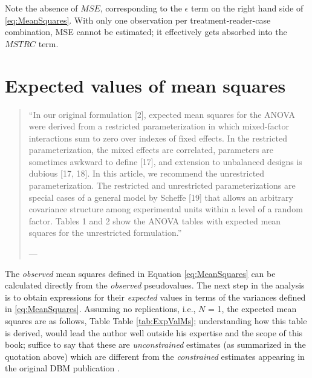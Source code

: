 \documentclass[
]{book}
\begin{document}
Note the absence of \(MSE\), corresponding to the \(\epsilon\) term on the right hand side of \eqref{eq:MeanSquares}. With only one observation per treatment-reader-case combination, MSE cannot be estimated; it effectively gets absorbed into the \(MSTRC\) term.

\hypertarget{expected-values-of-mean-squares}{%
\section{Expected values of mean squares}\label{expected-values-of-mean-squares}}

\begin{quote}
``In our original formulation {[}2{]}, expected mean squares for the ANOVA were derived from a restricted parameterization in which mixed-factor interactions sum to zero over indexes of fixed effects. In the restricted parameterization, the mixed effects are correlated, parameters are sometimes awkward to define {[}17{]}, and extension to unbalanced designs is dubious {[}17, 18{]}. In this article, we recommend the unrestricted parameterization. The restricted and unrestricted parameterizations are special cases of a general model by Scheffe {[}19{]} that allows an arbitrary covariance structure among experimental units within a level of a random factor. Tables 1 and 2 show the ANOVA tables with expected mean squares for the unrestricted formulation.''

--- \citep{RN2079}
\end{quote}

The \emph{observed} mean squares defined in Equation \eqref{eq:MeanSquares} can be calculated directly from the \emph{observed} pseudovalues. The next step in the analysis is to obtain expressions for their \emph{expected} values in terms of the variances defined in \eqref{eq:MeanSquares}. Assuming no replications, i.e., \(N\) = 1, the expected mean squares are as follows, Table Table \ref{tab:ExpValMs}; understanding how this table is derived, would lead the author well outside his expertise and the scope of this book; suffice to say that these are \emph{unconstrained} estimates (as summarized in the quotation above) which are different from the \emph{constrained} estimates appearing in the original DBM publication \citep{RN204}.
\end{document}
